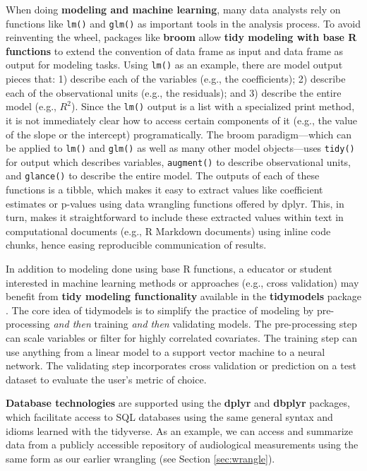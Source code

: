 \documentclass[12pt]{article}
\begin{document}
When doing \textbf{modeling and machine learning}, many data analysts
rely on functions like \texttt{lm()} and \texttt{glm()} as important
tools in the analysis process. To avoid reinventing the wheel, packages
like \textbf{broom} \citep{R-broom} allow \textbf{tidy modeling with
base R functions} to extend the convention of data frame as input and
data frame as output for modeling tasks. Using \texttt{lm()} as an
example, there are model output pieces that: 1) describe each of the
variables (e.g., the coefficients); 2) describe each of the
observational units (e.g., the residuals); and 3) describe the entire
model (e.g., \(R^2\)). Since the \texttt{lm()} output is a list with a
specialized print method, it is not immediately clear how to access
certain components of it (e.g., the value of the slope or the intercept)
programatically. The broom paradigm---which can be applied to
\texttt{lm()} and \texttt{glm()} as well as many other model
objects---uses \texttt{tidy()} for output which describes variables,
\texttt{augment()} to describe observational units, and
\texttt{glance()} to describe the entire model. The outputs of each of
these functions is a tibble, which makes it easy to extract values like
coefficient estimates or p-values using data wrangling functions offered
by dplyr. This, in turn, makes it straightforward to include these
extracted values within text in computational documents (e.g., R
Markdown documents) using inline code chunks, hence easing reproducible
communication of results.

In addition to modeling done using base R functions, a educator or
student interested in machine learning methods or approaches (e.g.,
cross validation) may benefit from \textbf{tidy modeling functionality}
available in the \textbf{tidymodels} package \citep{R-tidymodels}. The
core idea of tidymodels is to simplify the practice of modeling by
pre-processing \emph{and then} training \emph{and then} validating
models. The pre-processing step can scale variables or filter for highly
correlated covariates. The training step can use anything from a linear
model to a support vector machine to a neural network. The validating
step incorporates cross validation or prediction on a test dataset to
evaluate the user's metric of choice.

\textbf{Database technologies} are supported using the \textbf{dplyr}
\citep{R-dplyr} and \textbf{dbplyr} \citep{R-dbplyr} packages, which
facilitate access to SQL databases using the same general syntax and
idioms learned with the tidyverse. As an example, we can access and
summarize data from a publicly accessible repository of audiological
measurements \citep{voss_2019} using the same form as our earlier
wrangling (see Section \ref{sec:wrangle}).
\end{document}
